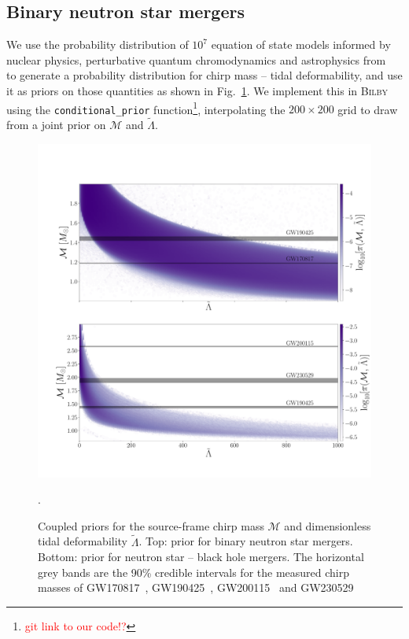 \documentclass[twocolumn]{aastex631}
\newcommand{\red}[1]{\textcolor{red}{#1}}
\begin{document}
	\subsection{Binary neutron star mergers}
	We use the probability distribution of $10^7$ equation of state models informed by nuclear physics, perturbative quantum chromodynamics and  astrophysics from~\citet{altiparmak22} to generate a probability distribution for chirp mass -- tidal deformability, and use it as priors on those quantities as shown in Fig.~\ref{fig:priors}. We implement this in \textsc{Bilby} using the \verb!conditional_prior! function\footnote{\red{git link to our code!?}},
	interpolating the $200\times200$ grid to draw from a joint prior on $\mathcal{M}$ and $\tilde{\Lambda}$. 
	\begin{figure}
		\centering
		\includegraphics[width=1.\linewidth]{Fig_1_Physics_priors.pdf}
		\caption{Coupled priors for the source-frame chirp mass $\mathcal{M}$ and dimensionless tidal deformability $\tilde{\Lambda}$. Top: prior for binary neutron star mergers. Bottom: prior for neutron star -- black hole mergers. The horizontal grey bands are the 90\% credible intervals for the measured chirp masses of GW170817~\citep{abbott17_170817observation}, GW190425~\citep{abbott20_190425}, GW200115~\citep{GW200115} and GW230529~\citep{GW230529}}. 
		\label{fig:priors}
	\end{figure}
	
\end{document}
